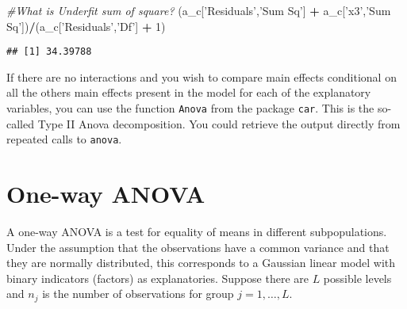 \documentclass[]{book}
\newenvironment{Shaded}{\begin{snugshade}}{\end{snugshade}}
\newcommand{\CommentTok}[1]{\textcolor[rgb]{0.56,0.35,0.01}{\textit{#1}}}
\newcommand{\DecValTok}[1]{\textcolor[rgb]{0.00,0.00,0.81}{#1}}
\newcommand{\NormalTok}[1]{#1}
\newcommand{\OperatorTok}[1]{\textcolor[rgb]{0.81,0.36,0.00}{\textbf{#1}}}
\newcommand{\StringTok}[1]{\textcolor[rgb]{0.31,0.60,0.02}{#1}}
\theoremstyle{definition}
\theoremstyle{definition}
\theoremstyle{definition}
\theoremstyle{remark}
\begin{document}
\begin{Shaded}
\begin{Highlighting}[]
\CommentTok{#What is Underfit sum of square?}
\NormalTok{(a_c[}\StringTok{'Residuals'}\NormalTok{,}\StringTok{'Sum Sq'}\NormalTok{] }\OperatorTok{+}\StringTok{ }\NormalTok{a_c[}\StringTok{'x3'}\NormalTok{,}\StringTok{'Sum Sq'}\NormalTok{])}\OperatorTok{/}\NormalTok{(a_c[}\StringTok{'Residuals'}\NormalTok{,}\StringTok{'Df'}\NormalTok{] }\OperatorTok{+}\StringTok{ }\DecValTok{1}\NormalTok{)}
\end{Highlighting}
\end{Shaded}

\begin{verbatim}
## [1] 34.39788
\end{verbatim}

If there are no interactions and you wish to compare main effects
conditional on all the others main effects present in the model for each
of the explanatory variables, you can use the function \texttt{Anova}
from the package \texttt{car}. This is the so-called Type II Anova
decomposition. You could retrieve the output directly from repeated
calls to \texttt{anova}.

\hypertarget{one-way-anova}{%
\section{One-way ANOVA}\label{one-way-anova}}

A one-way ANOVA is a test for equality of means in different
subpopulations. Under the assumption that the observations have a common
variance and that they are normally distributed, this corresponds to a
Gaussian linear model with binary indicators (factors) as explanatories.
Suppose there are \(L\) possible levels and \(n_j\) is the number of
observations for group \(j=1,\ldots, L\).
\end{document}
